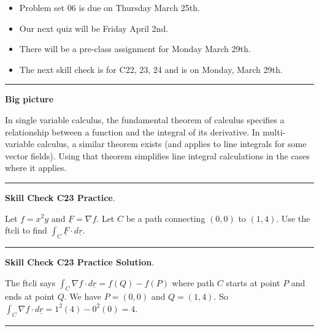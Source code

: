 \documentclass[12pt,letterpaper,noanswers]{exam}
\newcommand{\mb}[1]{\underline{#1}}
\begin{document}
 \pdfpageheight 11in 
  \pdfpagewidth 8.5in


\begin{itemize}
\itemsep0em
    \item Problem set 06 is due on Thursday March 25th.
    \item Our next quiz will be Friday April 2nd.
    \item There will be a pre-class assignment for Monday March 29th.
   \item The next skill check is for C22, 23, 24 and is on Monday, March 29th.
\end{itemize}

\hrule
\vspace{0.2cm}


\noindent\textbf{Big picture}

In single variable calculus, the fundamental theorem of calculus specifies a relationship between a function and the integral of its derivative.  In multi-variable calculus, a similar theorem exists (and applies to line integrals for some vector fields).  Using that theorem simplifies line integral calculations in the cases where it applies.

\vspace{0.2cm}
\hrule
\vspace{0.2cm}

\noindent\textbf{Skill Check C23 Practice}.  

Let $f = x^2y$ and $\mb F = \nabla f.$  Let $C$ be a path connecting $(0,0)$ to $(1,4)$.  Use the ftcli to find $\int_C \mb F \cdot d\mb r$.


\vspace{0.2cm}
\hrule
\vspace{0.2cm}

\noindent\textbf{Skill Check C23 Practice Solution}.  

The ftcli says $\int_C \nabla f \cdot d\mb r = f(Q) - f(P)$ where path $C$ starts at point $P$ and ends at point $Q$.  We have $P = (0,0)$ and $Q = (1,4)$.  So $\int_C \nabla f \cdot d\mb r = 1^2(4)-0^2(0) = 4$.

\vspace{0.2cm}
\hrule
\vspace{0.2cm}
\end{document}
